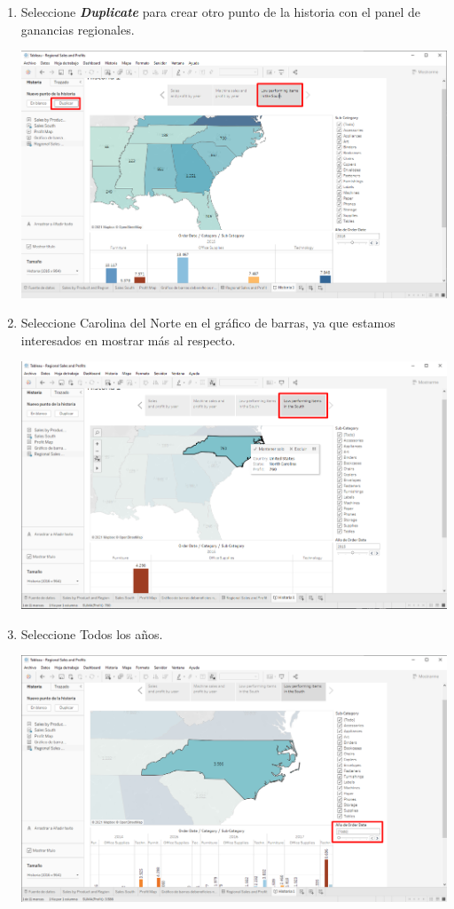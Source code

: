 \documentclass[12pt,letterpaper]{article}
\begin{document}
\begin{enumerate}
\begin{center}
        \end{center}
        \item Seleccione \textit{\textbf{Duplicate}} para crear otro punto de la historia con el panel de ganancias regionales.
        \begin{center}
            \includegraphics[width=15cm]{./img/img95.png}
        \end{center}
        \item Seleccione Carolina del Norte en el gráfico de barras, ya que estamos interesados en mostrar más al respecto.
        \begin{center}
            \includegraphics[width=15cm]{./img/img96.png}
        \end{center}
        \item Seleccione Todos los años.
        \begin{center}
            \includegraphics[width=15cm]{./img/img97.png}

\end{center}
\end{enumerate}
\end{document}
